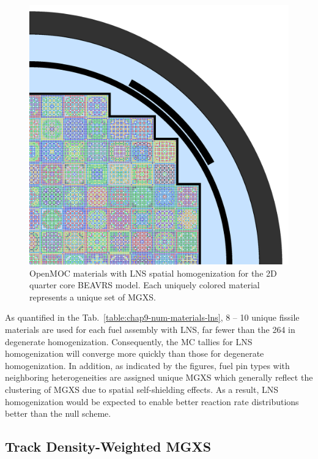 \begin{figure}[h!]
\centering
\includegraphics[width=\linewidth]{figures/patterns/lns/full-core/materials}
\vspace{2mm}
\caption[Depiction of LNS spatially homogenized materials for BEAVRS]{OpenMOC materials with \ac{LNS} spatial homogenization for the 2D quarter core \ac{BEAVRS} model. Each uniquely colored material represents a unique set of \ac{MGXS}.}
\label{fig:chap9-lns-materials-beavrs}
\end{figure}

As quantified in the Tab.~\ref{table:chap9-num-materials-lns}, 8 -- 10 unique fissile materials are used for each fuel assembly with \ac{LNS}, far fewer than the 264 in degenerate homogenization. Consequently, the \ac{MC} tallies for \ac{LNS} homogenization will converge more quickly than those for degenerate homogenization. In addition, as indicated by the figures, fuel pin types with neighboring heterogeneities are assigned unique \ac{MGXS} which generally reflect the clustering of \ac{MGXS} due to spatial self-shielding effects. As a result, \ac{LNS} homogenization would be expected to enable better reaction rate distributions better than the null scheme. 

\subsection{Track Density-Weighted MGXS}
\label{subsec:chap9-lns-math}

